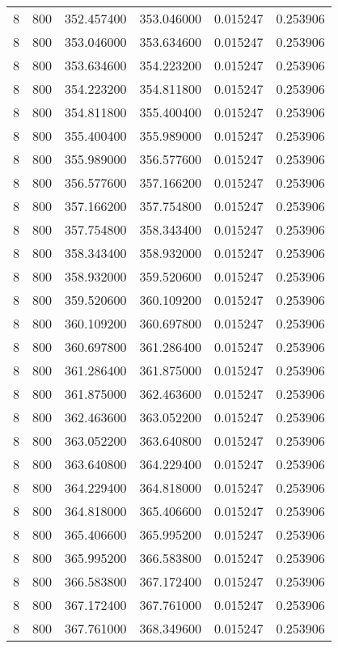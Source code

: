 \begin{longtable}{rrrrrr}
8 & 800 & 352.457400 & 353.046000 & 0.015247 & 0.253906 \\
8 & 800 & 353.046000 & 353.634600 & 0.015247 & 0.253906 \\
8 & 800 & 353.634600 & 354.223200 & 0.015247 & 0.253906 \\
8 & 800 & 354.223200 & 354.811800 & 0.015247 & 0.253906 \\
8 & 800 & 354.811800 & 355.400400 & 0.015247 & 0.253906 \\
8 & 800 & 355.400400 & 355.989000 & 0.015247 & 0.253906 \\
8 & 800 & 355.989000 & 356.577600 & 0.015247 & 0.253906 \\
8 & 800 & 356.577600 & 357.166200 & 0.015247 & 0.253906 \\
8 & 800 & 357.166200 & 357.754800 & 0.015247 & 0.253906 \\
8 & 800 & 357.754800 & 358.343400 & 0.015247 & 0.253906 \\
8 & 800 & 358.343400 & 358.932000 & 0.015247 & 0.253906 \\
8 & 800 & 358.932000 & 359.520600 & 0.015247 & 0.253906 \\
8 & 800 & 359.520600 & 360.109200 & 0.015247 & 0.253906 \\
8 & 800 & 360.109200 & 360.697800 & 0.015247 & 0.253906 \\
8 & 800 & 360.697800 & 361.286400 & 0.015247 & 0.253906 \\
8 & 800 & 361.286400 & 361.875000 & 0.015247 & 0.253906 \\
8 & 800 & 361.875000 & 362.463600 & 0.015247 & 0.253906 \\
8 & 800 & 362.463600 & 363.052200 & 0.015247 & 0.253906 \\
8 & 800 & 363.052200 & 363.640800 & 0.015247 & 0.253906 \\
8 & 800 & 363.640800 & 364.229400 & 0.015247 & 0.253906 \\
8 & 800 & 364.229400 & 364.818000 & 0.015247 & 0.253906 \\
8 & 800 & 364.818000 & 365.406600 & 0.015247 & 0.253906 \\
8 & 800 & 365.406600 & 365.995200 & 0.015247 & 0.253906 \\
8 & 800 & 365.995200 & 366.583800 & 0.015247 & 0.253906 \\
8 & 800 & 366.583800 & 367.172400 & 0.015247 & 0.253906 \\
8 & 800 & 367.172400 & 367.761000 & 0.015247 & 0.253906 \\
8 & 800 & 367.761000 & 368.349600 & 0.015247 & 0.253906 \\

\end{longtable}
